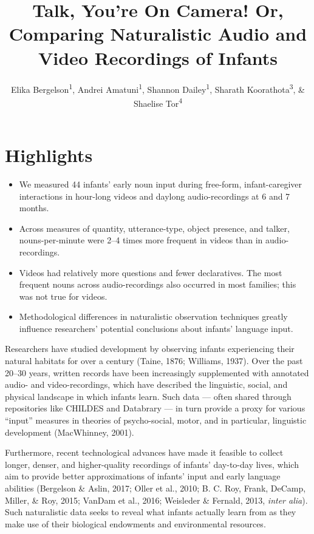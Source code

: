 \documentclass[man]{apa6}
\title{Talk, You're On Camera! Or, Comparing Naturalistic Audio and Video
Recordings of Infants}
\author{Elika Bergelson\textsuperscript{1}, Andrei Amatuni\textsuperscript{1}, Shannon Dailey\textsuperscript{1}, Sharath Koorathota\textsuperscript{3}, \& Shaelise Tor\textsuperscript{4}}
\affiliation{
    \vspace{0.5cm}
          \textsuperscript{1} Duke University\\
          \textsuperscript{2} University of Rochester\\
          \textsuperscript{3} Columbia University Medical Center\\
          \textsuperscript{4} Syracuse University  }
\providecommand{\tightlist}{%
  \setlength{\itemsep}{0pt}\setlength{\parskip}{0pt}}
\theoremstyle{definition}
\theoremstyle{definition}
\theoremstyle{definition}
\theoremstyle{remark}
\begin{document}
\maketitle

\setcounter{secnumdepth}{0}



\section{Highlights}\label{highlights}

\begin{itemize}
\tightlist
\item
  We measured 44 infants' early noun input during free-form,
  infant-caregiver interactions in hour-long videos and daylong
  audio-recordings at 6 and 7 months.
\item
  Across measures of quantity, utterance-type, object presence, and
  talker, nouns-per-minute were 2--4 times more frequent in videos than
  in audio-recordings.
\item
  Videos had relatively more questions and fewer declaratives. The most
  frequent nouns across audio-recordings also occurred in most families;
  this was not true for videos.
\item
  Methodological differences in naturalistic observation techniques
  greatly influence researchers' potential conclusions about infants'
  language input.
\end{itemize}

Researchers have studied development by observing infants experiencing
their natural habitats for over a century (Taine, 1876; Williams, 1937).
Over the past 20--30 years, written records have been increasingly
supplemented with annotated audio- and video-recordings, which have
described the linguistic, social, and physical landscape in which
infants learn. Such data --- often shared through repositories like
CHILDES and Databrary --- in turn provide a proxy for various
\enquote{input} measures in theories of psycho-social, motor, and in
particular, linguistic development (MacWhinney, 2001).

Furthermore, recent technological advances have made it feasible to
collect longer, denser, and higher-quality recordings of infants'
day-to-day lives, which aim to provide better approximations of infants'
input and early language abilities (Bergelson \& Aslin, 2017; Oller et
al., 2010; B. C. Roy, Frank, DeCamp, Miller, \& Roy, 2015; VanDam et
al., 2016; Weisleder \& Fernald, 2013, \emph{inter alia}). Such
naturalistic data seeks to reveal what infants actually learn from as
they make use of their biological endowments and environmental
resources.
\end{document}
